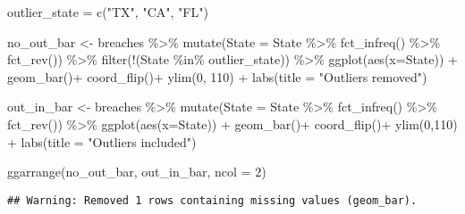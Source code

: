 \documentclass[
]{article}
\newenvironment{Shaded}{\begin{snugshade}}{\end{snugshade}}
\newcommand{\AttributeTok}[1]{\textcolor[rgb]{0.77,0.63,0.00}{#1}}
\newcommand{\DecValTok}[1]{\textcolor[rgb]{0.00,0.00,0.81}{#1}}
\newcommand{\FunctionTok}[1]{\textcolor[rgb]{0.00,0.00,0.00}{#1}}
\newcommand{\NormalTok}[1]{#1}
\newcommand{\OtherTok}[1]{\textcolor[rgb]{0.56,0.35,0.01}{#1}}
\newcommand{\SpecialCharTok}[1]{\textcolor[rgb]{0.00,0.00,0.00}{#1}}
\newcommand{\StringTok}[1]{\textcolor[rgb]{0.31,0.60,0.02}{#1}}
\begin{document}
\begin{Shaded}
\begin{Highlighting}[]
\NormalTok{outlier\_state }\OtherTok{=} \FunctionTok{c}\NormalTok{(}\StringTok{"TX"}\NormalTok{, }\StringTok{"CA"}\NormalTok{, }\StringTok{"FL"}\NormalTok{)}

\NormalTok{no\_out\_bar }\OtherTok{\textless{}{-}}\NormalTok{ breaches }\SpecialCharTok{\%\textgreater{}\%}
  \FunctionTok{mutate}\NormalTok{(}\AttributeTok{State =}\NormalTok{ State }\SpecialCharTok{\%\textgreater{}\%} \FunctionTok{fct\_infreq}\NormalTok{() }\SpecialCharTok{\%\textgreater{}\%} \FunctionTok{fct\_rev}\NormalTok{()) }\SpecialCharTok{\%\textgreater{}\%}
  \FunctionTok{filter}\NormalTok{(}\SpecialCharTok{!}\NormalTok{(State }\SpecialCharTok{\%in\%}\NormalTok{ outlier\_state)) }\SpecialCharTok{\%\textgreater{}\%}
  \FunctionTok{ggplot}\NormalTok{(}\FunctionTok{aes}\NormalTok{(}\AttributeTok{x=}\NormalTok{State)) }\SpecialCharTok{+}
  \FunctionTok{geom\_bar}\NormalTok{()}\SpecialCharTok{+}
  \FunctionTok{coord\_flip}\NormalTok{()}\SpecialCharTok{+}
  \FunctionTok{ylim}\NormalTok{(}\DecValTok{0}\NormalTok{, }\DecValTok{110}\NormalTok{) }\SpecialCharTok{+}
  \FunctionTok{labs}\NormalTok{(}\AttributeTok{title =} \StringTok{"Outliers removed"}\NormalTok{)}

\NormalTok{out\_in\_bar }\OtherTok{\textless{}{-}}\NormalTok{ breaches }\SpecialCharTok{\%\textgreater{}\%}
  \FunctionTok{mutate}\NormalTok{(}\AttributeTok{State =}\NormalTok{ State }\SpecialCharTok{\%\textgreater{}\%} \FunctionTok{fct\_infreq}\NormalTok{() }\SpecialCharTok{\%\textgreater{}\%} \FunctionTok{fct\_rev}\NormalTok{()) }\SpecialCharTok{\%\textgreater{}\%}
  \FunctionTok{ggplot}\NormalTok{(}\FunctionTok{aes}\NormalTok{(}\AttributeTok{x=}\NormalTok{State)) }\SpecialCharTok{+}
  \FunctionTok{geom\_bar}\NormalTok{()}\SpecialCharTok{+}
  \FunctionTok{coord\_flip}\NormalTok{()}\SpecialCharTok{+}
  \FunctionTok{ylim}\NormalTok{(}\DecValTok{0}\NormalTok{,}\DecValTok{110}\NormalTok{) }\SpecialCharTok{+}
  \FunctionTok{labs}\NormalTok{(}\AttributeTok{title =} \StringTok{"Outliers included"}\NormalTok{)}

\FunctionTok{ggarrange}\NormalTok{(no\_out\_bar, out\_in\_bar, }\AttributeTok{ncol =} \DecValTok{2}\NormalTok{)}
\end{Highlighting}
\end{Shaded}

\begin{verbatim}
## Warning: Removed 1 rows containing missing values (geom_bar).
\end{verbatim}
\end{document}
